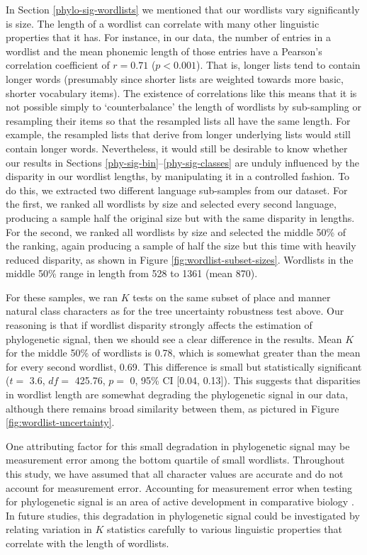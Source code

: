 In Section \ref{phylo-sig-wordlists} we mentioned that our wordlists vary significantly is size. The length of a wordlist can correlate with many other linguistic properties that it has. For instance, in our data, the number of entries in a wordlist and the mean phonemic length of those entries have a Pearson's correlation coefficient of \(r = 0.71\) (\(p < 0.001\)). That is, longer lists tend to contain longer words (presumably since shorter lists are weighted towards more basic, shorter vocabulary items). The existence of correlations like this means that it is not possible simply to `counterbalance' the length of wordlists by sub-sampling or resampling their items so that the resampled lists all have the same length. For example, the resampled lists that derive from longer underlying lists would still contain longer words. Nevertheless, it would still be desirable to know whether our results in Sections \ref{phy-sig-bin}--\ref{phy-sig-classes} are unduly influenced by the disparity in our wordlist lengths, by manipulating it in a controlled fashion. To do this, we extracted two different language sub-samples from our dataset. For the first, we ranked all wordlists by size and selected every second language, producing a sample half the original size but with the same disparity in lengths. For the second, we ranked all wordlists by size and selected the middle 50\% of the ranking, again producing a sample of half the size but this time with heavily reduced disparity, as shown in Figure \ref{fig:wordlist-subset-sizes}. Wordlists in the middle 50\% range in length from 528 to 1361 (mean 870).

For these samples, we ran \(K\) tests on the same subset of place and manner natural class characters as for the tree uncertainty robustness test above. Our reasoning is that if wordlist disparity strongly affects the estimation of phylogenetic signal, then we should see a clear difference in the results. Mean \(K\) for the middle 50\% of wordlists is 0.78, which is somewhat greater than the mean for every second wordlist, 0.69. This difference is small but statistically significant (\(t=\) 3.6, \(df=\) 425.76, \(p=\) 0, 95\% CI {[}0.04, 0.13{]}). This suggests that disparities in wordlist length are somewhat degrading the phylogenetic signal in our data, although there remains broad similarity between them, as pictured in Figure \ref{fig:wordlist-uncertainty}.

One attributing factor for this small degradation in phylogenetic signal may be measurement error among the bottom quartile of small wordlists. Throughout this study, we have assumed that all character values are accurate and do not account for measurement error. Accounting for measurement error when testing for phylogenetic signal is an area of active development in comparative biology \autocite{zheng_new_2009}. In future studies, this degradation in phylogenetic signal could be investigated by relating variation in \(K\) statistics carefully to various linguistic properties that correlate with the length of wordlists.

